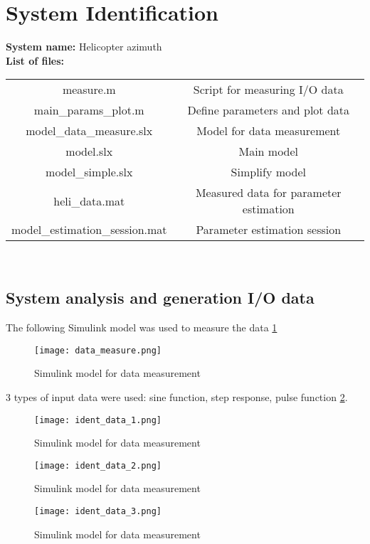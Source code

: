 \documentclass[../report.tex]{subfiles}
\begin{document}
\section{System Identification}

\textbf{System name:} Helicopter azimuth \\
\textbf{List of files:} 
\begin{tabular}{ |c|c| }
    \hline
    measure.m & Script for measuring I/O data \\
    main\_params\_plot.m & Define parameters and plot data \\
    model\_data\_measure.slx & Model for data measurement \\
    model.slx & Main model \\
    model\_simple.slx & Simplify model \\
    heli\_data.mat & Measured data for parameter estimation \\
    model\_estimation\_session.mat & Parameter estimation session \\
    \hline
\end{tabular} \\

\subsection{System analysis and generation I/O data}

The following Simulink model was used to measure the data
\ref{fig:data_measure}
\begin{figure}[htb!]
    \centering
    \texttt{[image: data\_measure.png]}
    \caption{Simulink model for data measurement}
    \label{fig:data_measure}
\end{figure}

3 types of input data were used: sine function, step response, pulse
function \ref{fig:ident_data_1}.

\begin{figure}[htb!]
    \centering
    \texttt{[image: ident\_data\_1.png]}
    \caption{Simulink model for data measurement}
    \label{fig:ident_data_1}
\end{figure}
\begin{figure}[htb!]
    \centering
    \texttt{[image: ident\_data\_2.png]}
    \caption{Simulink model for data measurement}
    \label{fig:ident_data_2}
\end{figure}
\begin{figure}[htb!]
    \centering
    \texttt{[image: ident\_data\_3.png]}
    \caption{Simulink model for data measurement}
    \label{fig:ident_data_3}
\end{figure}
\end{document}
